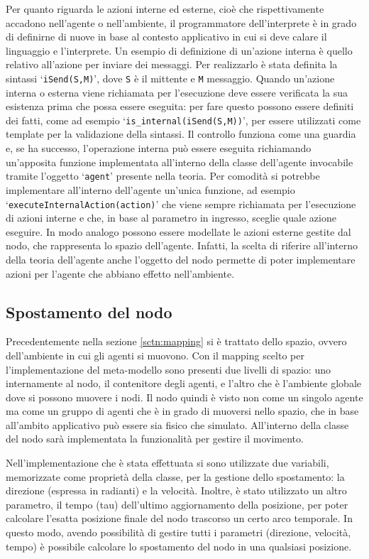 Per quanto riguarda le azioni interne ed esterne, cioè che rispettivamente accadono nell'agente o nell'ambiente, il programmatore dell'interprete è in grado di definirne di nuove in base al contesto applicativo in cui si deve calare il linguaggio e l'interprete. Un esempio di definizione di un'azione interna è quello relativo all'azione per inviare dei messaggi. Per realizzarlo è stata definita la sintassi `\texttt{iSend(S,M)}', dove \texttt{S} è il mittente e \texttt{M} messaggio. Quando un'azione interna o esterna viene richiamata per l'esecuzione deve essere verificata la sua esistenza prima che possa essere eseguita: per fare questo possono essere definiti dei fatti, come ad esempio `\texttt{is\_internal(iSend(S,M))}', per essere utilizzati come template per la validazione della sintassi. Il controllo funziona come una guardia e, se ha successo, l'operazione interna può essere eseguita richiamando un'apposita funzione implementata all'interno della classe dell'agente invocabile tramite l'oggetto `\texttt{agent}' presente nella teoria. Per comodità si potrebbe implementare all'interno dell'agente un'unica funzione, ad esempio `\texttt{executeInternalAction(action)}' che viene sempre richiamata per l'esecuzione di azioni interne e che, in base al parametro in ingresso, sceglie quale azione eseguire.
In modo analogo possono essere modellate le azioni esterne gestite dal nodo, che rappresenta lo spazio dell'agente. Infatti, la scelta di riferire all'interno della teoria dell'agente anche l'oggetto del nodo permette di poter implementare azioni per l'agente che abbiano effetto nell'ambiente.

\subsection{Spostamento del nodo}\label{sctn:SpostamentoNodo}
Precedentemente nella sezione \ref{sctn:mapping} si è trattato dello spazio, ovvero dell'ambiente in cui gli agenti si muovono. Con il mapping scelto per l'implementazione del meta-modello sono presenti due livelli di spazio: uno internamente al nodo, il contenitore degli agenti, e l'altro che è l'ambiente globale dove si possono muovere i nodi.
Il nodo quindi è visto non come un singolo agente ma come un gruppo di agenti che è in grado di muoversi nello spazio, che in base all'ambito applicativo può essere sia fisico che simulato. All'interno della classe del nodo sarà implementata la funzionalità per gestire il movimento.

Nell'implementazione che è stata effettuata si sono utilizzate due variabili, memorizzate come proprietà della classe, per la gestione dello spostamento: la direzione (espressa in radianti) e la velocità. Inoltre, è stato utilizzato un altro parametro, il tempo (tau) dell'ultimo aggiornamento della posizione, per poter calcolare l'esatta posizione finale del nodo trascorso un certo arco temporale. In questo modo, avendo possibilità di gestire tutti i parametri (direzione, velocità, tempo) è possibile calcolare lo spostamento del nodo in una qualsiasi posizione.

